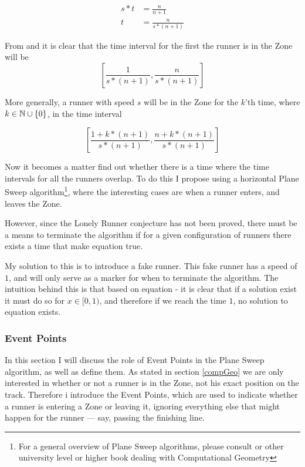 \begin{equation}
\label{eqa:speedTwo}
\begin{split}
s * t &= \frac{n}{n+1} \\
t &= \frac{n}{s * (n+1)}
\end{split}
\end{equation}

From  and  it is clear that the time interval for the first the runner is in the Zone will be 
\begin{displaymath}
\left[\frac{1}{s * (n+1)}, \frac{n}{s * (n+1)}\right]
\end{displaymath}

More generally, a runner with speed $s$ will be in the Zone for the $k$'th time, where $k \in \mathbb{N} \cup \{0\}$, in the time interval 

\begin{displaymath}
\left[\frac{1 + k * (n+1)}{s * (n+1)}, \frac{n + k * (n+1)}{s * (n+1)}\right] 
\end{displaymath}

Now it becomes a matter find out whether there is a time where the time intervals for all the runners overlap. To do this I propose using a horizontal Plane Sweep algorithm\footnote{For a general overview of Plane Sweep algorithms, please consult \cite{citeulike:3347056} or other university level or higher book dealing with Computational Geometry}, where the interesting cases are when a runner enters, and leaves the Zone. 

However, since the Lonely Runner conjecture has not been proved, there must be a means to terminate the algorithm if for a given configuration of runners there exists a time that make equation  true.

My solution to this is to introduce a fake runner. This fake runner has a speed of $1$, and will only serve as a marker for when to terminate the algorithm. The intuition behind this is that based on equation  - it is clear that if a solution exist it must do so for $x \in [0,1)$, and therefore if we reach the time $1$, no solution to equation  exists. 

\subsubsection{Event Points}
\label{eventPoints}
In this section I will discuss the role of Event Points in the Plane Sweep algorithm, as well as define them. As stated in section \ref{compGeo} we are only interested in whether or not a runner is in the Zone, not his exact position on the track. Therefore i introduce the Event Points, which are used to indicate whether a runner is entering a Zone or leaving it, ignoring everything else that might happen for the runner --- say, passing the finishing line. 

